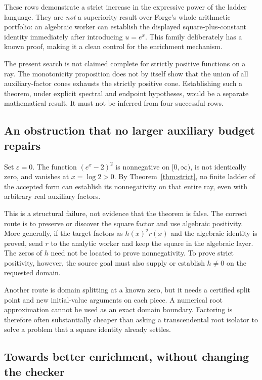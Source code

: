 These rows demonstrate a strict increase in the expressive power of the ladder
language. They are \emph{not} a superiority result over Forge's whole arithmetic
portfolio: an algebraic worker can establish the displayed square-plus-constant
identity immediately after introducing $u=e^x$. This family deliberately has a
known proof, making it a clean control for the enrichment mechanism.

The present search is not claimed complete for strictly positive functions on
a ray. The monotonicity proposition does not by itself show that the union of
all auxiliary-factor cones exhausts the strictly positive cone. Establishing
such a theorem, under explicit spectral and endpoint hypotheses, would be a
separate mathematical result. It must not be inferred from four successful
rows.

\subsection{An obstruction that no larger auxiliary budget repairs}

Set $\varepsilon=0$. The function $(e^x-2)^2$ is nonnegative on $[0,\infty)$,
is not identically zero, and vanishes at $x=\log2>0$. By
Theorem~\ref{thm:strict}, no finite ladder of the accepted form can establish
its nonnegativity on that entire ray, even with arbitrary real auxiliary
factors.

This is a structural failure, not evidence that the theorem is false. The
correct route is to preserve or discover the square factor and use algebraic
positivity. More generally, if the target factors as $h(x)^2r(x)$ and the
algebraic identity is proved, send $r$ to the analytic worker and keep the
square in the algebraic layer. The zeros of $h$ need not be located to prove
nonnegativity. To prove strict positivity, however, the source goal must also
supply or establish $h\ne0$ on the requested domain.

Another route is domain splitting at a known zero, but it needs a certified
split point and new initial-value arguments on each piece. A numerical root
approximation cannot be used as an exact domain boundary. Factoring is therefore
often substantially cheaper than asking a transcendental root isolator to
solve a problem that a square identity already settles.

\subsection{Towards better enrichment, without changing the checker}

